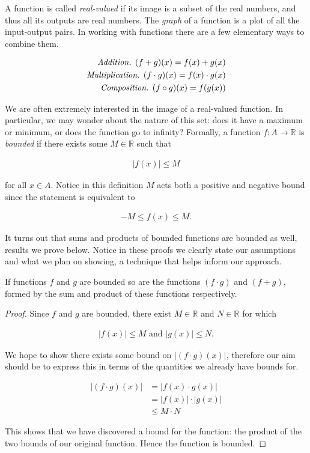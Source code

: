 \documentclass[twoside]{report}
\begin{document}
A function is called \emph{real-valued} if its image is a subset of the real numbers, and thus all its outputs are real numbers. The \emph{graph} of a function is a plot of all the input-output pairs. In working with functions there are a few elementary ways to combine them.

\begin{align}
	\emph{Addition. } (f + g)(x) = f(x) + g(x) \\
	\emph{Multiplication. } (f \cdot g)(x) = f(x) \cdot g(x) \\
	\emph{Composition. } (f \circ g)(x) = f(g(x))
\end{align}

We are often extremely interested in the image of a real-valued function. In particular, we may wonder about the nature of this set: does it have a maximum or minimum, or does the function go to infinity? Formally, a function $f: A \rightarrow \mathbb{R}$ is \emph{bounded} if there exists some $M \in \mathbb{R}$ such that

\begin{align*}
	|f(x)| \le M
\end{align*}

for all $x \in A$. Notice in this definition $M$ acts both a positive and negative bound since the statement is equivalent to

\begin{align*}
	-M \le f(x) \le M.
\end{align*}

It turns out that sums and products of bounded functions are bounded as well, results we prove below. Notice in these proofs we clearly state our assumptions and what we plan on showing, a technique that helps inform our approach.

\vspace{\baselineskip}
\begin{theorem}
	If functions $f$ and $g$ are bounded so are the functions $(f \cdot g)$ and $(f + g)$, formed by the sum and product of these functions respectively.
\end{theorem}

\begin{proof}
	Since $f$ and $g$ are bounded, there exist $M \in \mathbb{R}$ and $N \in \mathbb{R}$ for which 
	
	\begin{align*}
		|f(x)| \le M \text{ and } |g(x)| \le N.
	\end{align*}
	
	We hope to show there exists some bound on $|(f \cdot g)(x)|$, therefore our aim should be to express this in terms of the quantities we already have bounds for.
	
	\begin{align*}
		|(f \cdot g)(x)| &= |f(x) \cdot g(x)| \\
		&= |f(x)| \cdot |g(x)| \\
		&\le M \cdot N
	\end{align*}
	
	This shows that we have discovered a bound for the function: the product of the two bounds of our original function. Hence the function is bounded.
\end{proof}
\end{document}
